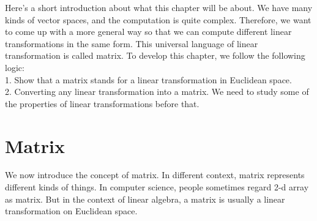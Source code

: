 \renewcommand{\x}{\mathbf{x}}
\renewcommand{\v}{\mathbf{v}}
\renewcommand{\w}{\mathbf{w}}
\newcommand{\B}{\mathcal{B}}
\newcommand{\egsum}{c_1\mathbf{e}_1+\c_2\mathbf{e}_2+\cdots+c_n\mathbf{e}_n}
\newcommand{\egmatrix}{\begin{pmatrix}
    |& \ & | \\
    \mathbf{a}_1& \cdots& \mathbf{a}_n \\
    |& \ & | \\
\end{pmatrix}}
\newcommand{\egbasis}{\{\mathbf{b}_1,\mathbf{b}_2,\cdots,\mathbf{b}_n\}}

Here's a short introduction about what this chapter will be about. We have many kinds of vector spaces, and the computation is quite complex. Therefore, we want to come up with a more general way so that we can compute different linear transformations in the same form. This universal language of linear transformation is called matrix. To develop this chapter, we follow the following logic:\\

1. Show that a matrix stands for a linear transformation in Euclidean space.\\

2. Converting any linear transformation into a matrix. We need to study some of the properties of linear transformations before that.








\section{Matrix}
We now introduce the concept of matrix. In different context, matrix represents different kinds of things. In computer science, people sometimes regard 2-d array as matrix. But in the context of linear algebra, a matrix is usually a linear transformation on Euclidean space.\\

